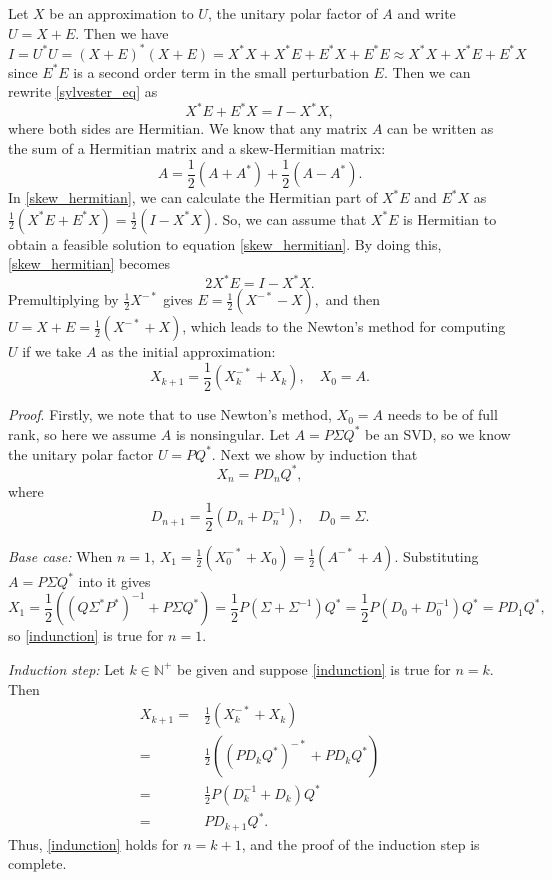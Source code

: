 \documentclass[12pt]{article}
\begin{document}
 Let $X$ be an approximation to $U$, the unitary polar factor of $A$ and write $U=X+E$. Then we have 
\begin{equation}\label{sylvester_eq}
I=U^*U=(X+E)^*(X+E)=X^*X+X^*E+E^*X+E^*E\approx X^*X+X^*E+E^*X
\end{equation}
since $E^*E$ is a second order term in the small perturbation $E$. Then we can rewrite \eqref{sylvester_eq} as 
\begin{equation}\label{skew_hermitian}
X^*E+E^*X = I - X^*X,
\end{equation}
where both sides are Hermitian. We know that any matrix $A$ can be written as the sum of a Hermitian matrix and a skew-Hermitian matrix:
$$
A = \frac{1}{2}(A+A^*) + \frac{1}{2}(A-A^*).
$$
In \eqref{skew_hermitian}, we can calculate the Hermitian part of $X^*E$ and $E^*X$ as $\frac{1}{2}(X^*E+E^*X) = \frac{1}{2}(I - X^*X)$. So, we can assume that $X^*E$ is Hermitian to obtain a feasible solution to equation \eqref{skew_hermitian}. By doing this, \eqref{skew_hermitian} becomes
$$
2X^*E =I - X^*X.
$$
Premultiplying by $\frac{1}{2}X^{-*}$ gives
$
E = \frac{1}{2}(X^{-*}-X),
$
and then $U = X+E = \frac{1}{2}(X^{-*}+X)$, which leads to the Newton's method for computing $U$ if we take $A$ as the initial approximation: 
\begin{equation}\label{Newton_iter}
X_{k+1} = \frac{1}{2}(X_k^{-*}+X_k),\quad X_0=A.
\end{equation}
\vspace{.2cm}




 {\it  Proof}. Firstly, we note that to use Newton's method, $X_0=A$ needs to be of full rank, so here we assume $A$ is nonsingular. Let $A=P\Sigma Q^*$ be an SVD, so we know the unitary polar factor $U=PQ^*$. Next we show by induction that
\begin{equation} \label{indunction}
X_n = PD_nQ^*,
\end{equation}
where 
\begin{equation}\label{signfun}
D_{n+1}= \frac{1}{2}(D_n+D_n^{-1}),\quad D_0=\Sigma.
\end{equation}

{\it Base case:} When $n=1$, $X_1=\frac{1}{2}(X_0^{-*}+X_0)=\frac{1}{2}(A^{-*}+A)$. Substituting $A=P\Sigma Q^*$ into it gives
$$
X_1=\frac{1}{2}((Q\Sigma^* P^*)^{-1}+P\Sigma Q^*)=\frac{1}{2}P(\Sigma+\Sigma^{-1})Q^*
=\frac{1}{2}P(D_0+D_0^{-1})Q^*=PD_1Q^*,
$$
so \eqref{indunction} is true for $n=1$.

{\it Induction step:} Let $k\in\mathbb{N^+}$ be given and  suppose \eqref{indunction} is true for $n = k$. Then 
\begin{align*}
X_{k+1} =& \frac{1}{2}(X_k^{-*}+X_k) \\
  =& \frac{1}{2}((PD_kQ^*)^{-*}+PD_kQ^*) \\
  =& \frac{1}{2}P(D_k^{-1}+D_k)Q^* \\
  =& PD_{k+1}Q^*.
\end{align*}
Thus, \eqref{indunction} holds for $n=k+1$, and the proof of the induction step is complete.
\end{document}
